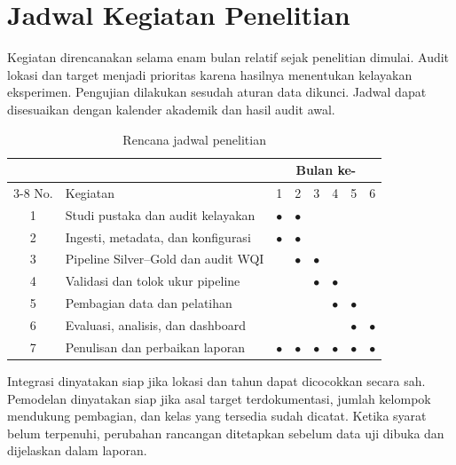 \par\noindent\begin{minipage}{\linewidth}
\section{Jadwal Kegiatan Penelitian}

Kegiatan direncanakan selama enam bulan relatif sejak penelitian dimulai. Audit lokasi dan target menjadi prioritas karena hasilnya menentukan kelayakan eksperimen. Pengujian dilakukan sesudah aturan data dikunci. Jadwal dapat disesuaikan dengan kalender akademik dan hasil audit awal.

\begin{table}[H]
    \centering
    \caption{Rencana jadwal penelitian}
    \label{tab:bab3-jadwal}
    \small
    \renewcommand{\arraystretch}{1.25}
    \begin{tabularx}{\linewidth}{@{}c>{\raggedright\arraybackslash}Xcccccc@{}}
        \toprule
        & & \multicolumn{6}{c}{Bulan ke-} \\
        \cmidrule(lr){3-8}
        No. & Kegiatan & 1 & 2 & 3 & 4 & 5 & 6 \\
        \midrule
        1 & Studi pustaka dan audit kelayakan & $\bullet$ & $\bullet$ & & & & \\
        2 & Ingesti, metadata, dan konfigurasi & $\bullet$ & $\bullet$ & & & & \\
        3 & Pipeline Silver--Gold dan audit WQI & & $\bullet$ & $\bullet$ & & & \\
        4 & Validasi dan tolok ukur pipeline & & & $\bullet$ & $\bullet$ & & \\
        5 & Pembagian data dan pelatihan & & & & $\bullet$ & $\bullet$ & \\
        6 & Evaluasi, analisis, dan dashboard & & & & & $\bullet$ & $\bullet$ \\
        7 & Penulisan dan perbaikan laporan & $\bullet$ & $\bullet$ & $\bullet$ & $\bullet$ & $\bullet$ & $\bullet$ \\
        \bottomrule
    \end{tabularx}
\end{table}

Integrasi dinyatakan siap jika lokasi dan tahun dapat dicocokkan secara sah. Pemodelan dinyatakan siap jika asal target terdokumentasi, jumlah kelompok mendukung pembagian, dan kelas yang tersedia sudah dicatat. Ketika syarat belum terpenuhi, perubahan rancangan ditetapkan sebelum data uji dibuka dan dijelaskan dalam laporan.
\end{minipage}\par
